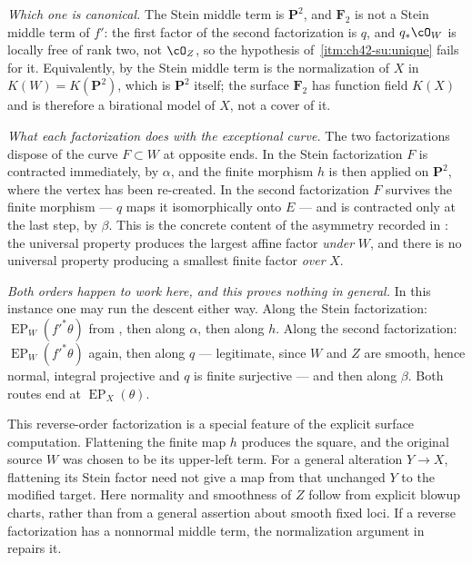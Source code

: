 \begin{example}
\emph{Which one is canonical.}  The Stein middle term is $\mathbf P^2$, and
$\mathbf F_2$ is not a Stein middle term of $f'$: the first factor of the
second factorization is $q$, and $q_*\cO_W$ is locally free of rank two,
not $\cO_Z$, so the hypothesis of
\,\cref{itm:ch42-su:unique} fails for it.
Equivalently, by  the Stein middle term
is the normalization of $X$ in $K(W)=K(\mathbf P^2)$, which is
$\mathbf P^2$ itself; the surface $\mathbf F_2$ has function field
$K(X)$ and is therefore a birational model of $X$, not a cover of it.

\emph{What each factorization does with the exceptional curve.}  The two
factorizations dispose of the curve $F\subset W$ at opposite ends.  In the
Stein factorization $F$ is contracted immediately, by $\alpha$, and the
finite morphism $h$ is then applied on $\mathbf P^2$, where the vertex
has been re-created.  In the second factorization $F$ survives the finite
morphism --- $q$ maps it isomorphically onto $E$ --- and is contracted
only at the last step, by $\beta$.  This is the concrete content of the
asymmetry recorded in : the universal property
produces the largest affine factor \emph{under} $W$, and there is no
universal property producing a smallest finite factor \emph{over} $X$.

\emph{Both orders happen to work here, and this proves nothing in general.}
In this instance one may run the descent either way.  Along the Stein
factorization: $\operatorname{EP}_W(f'^*\theta)$ from
, then
 along $\alpha$, then
 along $h$.  Along the second
factorization: $\operatorname{EP}_W(f'^*\theta)$ again, then
 along $q$ --- legitimate, since
$W$ and $Z$ are smooth, hence normal, integral projective and $q$ is
finite surjective --- and then  along
$\beta$.  Both routes end at $\operatorname{EP}_X(\theta)$.

This reverse-order factorization is a special feature of the explicit
surface computation.  Flattening the finite map $h$ produces the square,
and the original source $W$ was chosen to be its upper-left term.
For a general alteration $Y\to X$, flattening its Stein factor
need not give a map from that unchanged $Y$ to the modified target.
Here normality and smoothness of $Z$ follow from explicit blowup
charts, rather than from a general assertion about smooth fixed loci.
If a reverse factorization has a nonnormal middle term, the
normalization argument in  repairs it.
\end{example}

